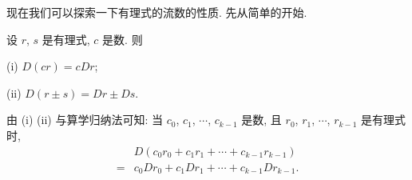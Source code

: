 现在我们可以探索一下有理式的流数的性质. 先从简单的开始.

\begin{proposition}
    设 $r$, $s$ 是有理式, $c$ 是数. 则

    (i) $D(cr) = c Dr$;

    (ii) $D(r \pm s) = Dr \pm Ds$.

    由 (i) (ii) 与算学归纳法可知: 当 $c_0$, $c_1$, $\cdots$, $c_{k-1}$ 是数, 且 $r_0$, $r_1$, $\cdots$, $r_{k-1}$ 是有理式时,
    \begin{align*}
             & D \left( c_0 r_0 + c_1 r_1 + \cdots + c_{k-1} r_{k-1} \right) \\
        = {} & c_0 Dr_0 + c_1 Dr_1 + \cdots + c_{k-1} Dr_{k-1}.
    \end{align*}
\end{proposition}

